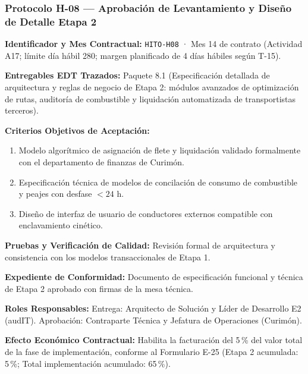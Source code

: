 \subsubsection*{Protocolo H-08 — Aprobación de Levantamiento y Diseño de Detalle Etapa 2}\label{sec:9-proto-h8}
\par\noindent\textbf{Identificador y Mes Contractual:} \texttt{HITO-H08} · Mes 14 de contrato (Actividad A17; límite día hábil 280; margen planificado de 4 días hábiles según T-15).\par
\par\noindent\textbf{Entregables EDT Trazados:} Paquete 8.1 (Especificación detallada de arquitectura y reglas de negocio de Etapa 2: módulos avanzados de optimización de rutas, auditoría de combustible y liquidación automatizada de transportistas terceros).\par
\par\noindent\textbf{Criterios Objetivos de Aceptación:}
\begin{enumerate}
  \item Modelo algorítmico de asignación de flete y liquidación validado formalmente con el departamento de finanzas de Curimón.
  \item Especificación técnica de modelos de concilación de consumo de combustible y peajes con desfase $< 24\text{ h}$.
  \item Diseño de interfaz de usuario de conductores externos compatible con enclavamiento cinético.
\end{enumerate}
\par\noindent\textbf{Pruebas y Verificación de Calidad:} Revisión formal de arquitectura y consistencia con los modelos transaccionales de Etapa 1.\par
\par\noindent\textbf{Expediente de Conformidad:} Documento de especificación funcional y técnica de Etapa 2 aprobado con firmas de la mesa técnica.\par
\par\noindent\textbf{Roles Responsables:} Entrega: Arquitecto de Solución y Líder de Desarrollo E2 (audIT). Aprobación: Contraparte Técnica y Jefatura de Operaciones (Curimón).\par
\par\noindent\textbf{Efecto Económico Contractual:} Habilita la facturación del 5\,\% del valor total de la fase de implementación, conforme al Formulario E-25 (Etapa 2 acumulada: 5\,\%; Total implementación acumulado: 65\,\%).\par


